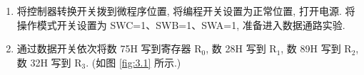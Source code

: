 \documentclass[../main.tex]{subfiles}
\begin{document}
\begin{enumerate}

    \item 将控制器转换开关拨到微程序位置, 将编程开关设置为正常位置, 打开电源. 将操作模式开关设置为 SWC=1、SWB=1、SWA=1, 准备进入数据通路实验.

    \item 通过数据开关依次将数 75H 写到寄存器 R$_0$, 数 28H 写到 R$_1$, 数 89H 写到 R$_2$, 数 32H 写到 R$_3$. (如图 \ref{fig:3.1} 所示.)

          \begin{figure}[htbp]
              \centering
              \\
\end{figure}
\end{enumerate}
\end{document}
